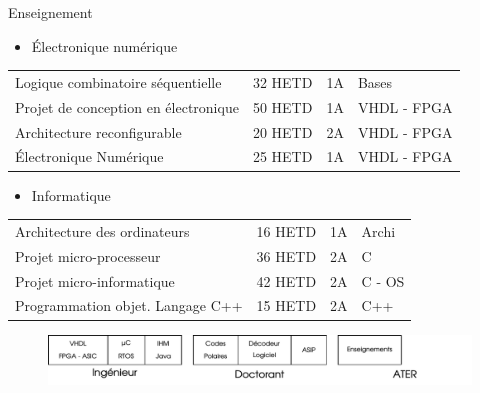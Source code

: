 \documentclass[t,compress,mathserif,12pt,xcolor=dvipsnames]{beamer}
\begin{document}
\begin{frame}[t]{Enseignement}
  \begin{minipage}[t][5.0cm][t]{\textwidth}
    \vspace{-0.5cm}
    \begin{itemize}
      \item<+-> \'Electronique numérique \\
    \end{itemize}
    \small{
      \begin{tabular}{ l l l l }
      Logique combinatoire s\'equentielle & 32 HETD & 1A & Bases       \\
      Projet de conception en \'electronique         & 50 HETD & 1A & VHDL - FPGA \\
      Architecture reconfigurable                    & 20 HETD & 2A & VHDL - FPGA \\
      \'Electronique Num\'erique                     & 25 HETD & 1A & VHDL - FPGA
    \end{tabular}
    }
    \vspace{0cm}
    \begin{itemize}
      \item<+-> Informatique
    \end{itemize}
    \small{
    \begin{tabular}{ l l l l }
      Architecture des ordinateurs     & 16 HETD & 1A & Archi  \\
      Projet micro-processeur          & 36 HETD & 2A & C      \\
      Projet micro-informatique        & 42 HETD & 2A & C - OS \\
      Programmation objet. Langage C++ & 15 HETD & 2A & C++
    \end{tabular}
    }
  \end{minipage}
  \begin{figure}[htp]
    \centering
    \includegraphics[width=\textwidth]{fig/frise8}
  \end{figure}
\end{frame}
\end{document}
